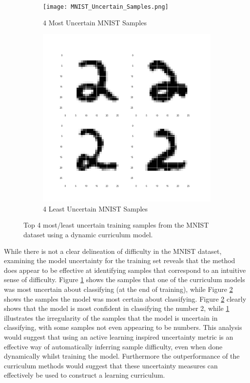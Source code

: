 \begin{figure}[h!]
\hspace*{-3cm}    
\centering
\begin{subfigure}{0.7\textwidth}
  \centering
  \texttt{[image: MNIST\_Uncertain\_Samples.png]}
  \caption{4 Most Uncertain MNIST Samples}
  \label{fig:MNIST_Uncertain}
\end{subfigure}%
\begin{subfigure}{0.7\textwidth}
\hspace*{-1cm}   
  \centering
  \includegraphics[width=1\linewidth]{MNIST_certain_Samples.png}
  \caption{4 Least Uncertain MNIST Samples}
  \label{fig:MNIST Certain}
\end{subfigure}
\caption{Top 4 most/least uncertain training samples from the MNIST dataset using a dynamic curriculum model.}
\label{fig:MNISTSampleUncertainty}
\end{figure}


While there is not a clear delineation of difficulty in the MNIST dataset, examining the model uncertainty for the training set reveals that the method does appear to be effective at identifying samples that correspond to an intuitive sense of difficulty. Figure \ref{fig:MNIST_Uncertain} shows the samples that one of the curriculum models was most uncertain about classifying (at the end of training), while Figure \ref{fig:MNIST Certain} shows the samples the model was most certain about classifying. Figure \ref{fig:MNIST Certain} clearly shows that the model is most confident in classifying the number 2, while \ref{fig:MNIST_Uncertain} illustrates the irregularity of the samples that the model is uncertain in classifying, with some samples not even appearing to be numbers. This analysis would suggest that using an active learning inspired uncertainty metric is an effective way of automatically inferring sample difficulty, even when done dynamically whilst training the model. Furthermore the outperformance of the curriculum methods would suggest that these uncertainty measures can effectively be used to construct a learning curriculum.

